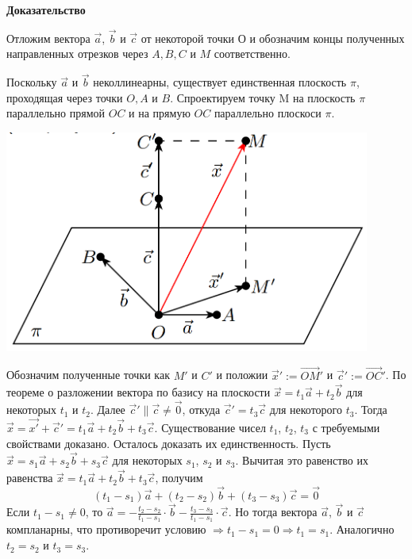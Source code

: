 \documentclass[a4paper]{article}
\begin{document}
    \begin{hproof}
        \textbf{Доказательство}

        Отложим вектора $\vec{a}$, $\vec{b}$  и $\vec{c}$ от некоторой точки $О$ и обозначим концы полученных направленных отрезков через $A, B, C$ и $M$ соответственно.

        Поскольку $\vec{a}$ и $\vec{b}$ неколлинеарны, существует единственная плоскость $\pi$, проходящая через точки $O, A$ и $B$. Спроектируем точку M на плоскость $\pi$ параллельно прямой $OC$ и на прямую $OC$ параллельно плоскоси $\pi$.

        \includegraphics[width=12cm]{t3}

        Обозначим полученные точки как $M'$ и $C'$ и положии $\vec{x}' := \overrightarrow{OM}'$ и $\vec{c}' := \overrightarrow{OC}'$. По теореме о разложении вектора по базису на плоскости  $\vec{x} = t_1 \vec{a} + t_2 \vec{b}$ для некоторых $t_1$ и $t_2$. Далее $\vec{c}' \parallel \vec{c} \neq \vec{0}$, откуда $\vec{c}' = t_3 \vec{c}$ для некоторого $t_3$. Тогда $\vec{x} = \vec{x'} + \vec{c}' = t_1 \vec{a} + t_2 \vec{b} + t_3 \vec{c}$. Существование чисел $t_1$, $t_2$, $t_3$ с требуемыми свойствами доказано.
        Осталось доказать их единственность. Пусть $\vec{x} = s_1 \vec{a} + s_2 \vec{b} + s_3 \vec{c}$ для некоторых $s_1$, $s_2$ и $s_3$. Вычитая это равенство их равенства $\vec{x} = t_1 \vec{a} + t_2 \vec{b} + t_3 \vec{c}$, получим
        \begin{equation}
        (t_1 -s_1)
            \vec{a} + (t_2 - s_2)\vec{b} + (t_3 - s_3) \vec{c} = \vec{0}
        \end{equation}
        Если $\displaystyle t_1 -s_1 \neq    0$, то $\displaystyle \vec{a} = - \frac{t_2 - s_2}{t_1 - s_1} \cdot \vec{b} - \frac{t_3 - s_3}{t_1 - s_1} \cdot \vec{c}$. Но тогда вектора $\vec{a}$, $\vec{b}$ и $\vec{c}$ компланарны, что противоречит условию $\Rightarrow t_1 - s_1 = 0 \Rightarrow t_1 = s_1$. Аналогично $t_2 = s_2$ и $t_3 = s_3$.
    \end{hproof}
\end{document}
